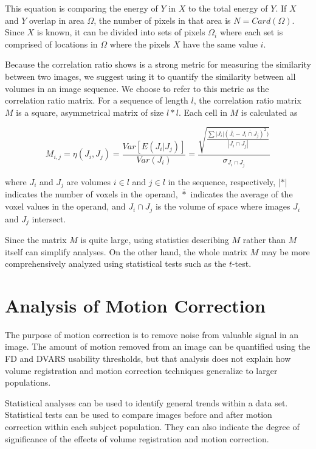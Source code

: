 This equation is comparing the energy of $Y$ in $X$ to the total energy of $Y$. If $X$ and $Y$ overlap in area $\Omega$, the number of pixels in that area is $N = Card(\Omega)$. Since $X$ is known, it can be divided into sets of pixels $\Omega_i$ where each set is comprised of locations in $\Omega$ where the pixels $X$ have the same value $i$. 

Because the correlation ratio shows is a strong metric for measuring the similarity between two images, we suggest using it to quantify the similarity between all volumes in an image sequence. We choose to refer to this metric as the correlation ratio matrix. For a sequence of length $l$, the correlation ratio matrix $M$ is a square, asymmetrical matrix of size $l*l$. Each cell in $M$ is calculated as

\begin{equation}
M_{i,j} = \eta(J_i, J_j) = \frac{Var[E(J_i|J_j)]}{Var(J_i)} =  \frac{\sqrt{\frac{\sum |J_i|(\overline{J_i} - \overline{J_i \cap J_j})^2)}{|J_i \cap J_j|}}}{\sigma_{J_i \cap J_j}}
\end{equation}

\noindent where $J_i$ and $J_j$ are volumes $i \in l$ and $j \in l$ in the sequence, respectively, $|*|$ indicates the number of voxels in the operand, $\overline{*}$ indicates the average of the voxel values in the operand, and $J_i \cap J_j$ is the volume of space where images $J_i$ and $J_j$ intersect. %

Since the matrix $M$ is quite large, using statistics describing $M$ rather than $M$ itself can simplify analyses. On the other hand, the whole matrix $M$ may be more comprehensively analyzed using statistical tests such as the $t$-test.

\section{Analysis of Motion Correction}

The purpose of motion correction is to remove noise from valuable signal in an image. The amount of motion removed from an image can be quantified using the FD and DVARS usability thresholds, but that analysis does not explain how volume registration and motion correction techniques generalize to larger populations.

Statistical analyses can be used to identify general trends within a data set. Statistical tests can be used to compare images before and after motion correction within each subject population. They can also indicate the degree of significance of the effects of volume registration and motion correction. 

